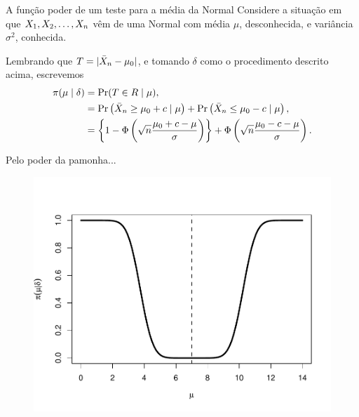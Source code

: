 \begin{frame}{A função poder de um teste para a média da Normal}
 Considere a situação em que $X_1, X_2, \ldots, X_n$ vêm de uma Normal com média $\mu$, desconhecida, e variância $\sigma^2$, conhecida.
 \begin{exemplo}
 \label{ex:power_function_normal_mean_test}
  Lembrando que $T = |\bar{X}_n - \mu_0|$, e tomando $\delta$ como o procedimento descrito acima, escrevemos
  \begin{align*}
   \pi(\mu \mid \delta) &= \operatorname{Pr}(T \in R \mid \mu),\\
   &= \operatorname{Pr}\left(\bar{X}_n \geq \mu_0 + c \mid \mu \right) + \operatorname{Pr}\left( \bar{X}_n \leq \mu_0 -c \mid \mu \right),\\
   &= \left\{ 1 - \Phi\left(\sqrt{n} \frac{\mu_0 + c -\mu}{\sigma}\right) \right\} + \Phi\left(\sqrt{n} \frac{\mu_0 - c -\mu}{\sigma}\right). 
  \end{align*}
 \end{exemplo}
\end{frame}

\begin{frame}{Pelo poder da pamonha...}
\begin{figure}
 \begin{center}
  \includegraphics[scale=0.6]{figures/poder_palmirinha.pdf}
 \end{center}
\end{figure} 
\end{frame}
 
